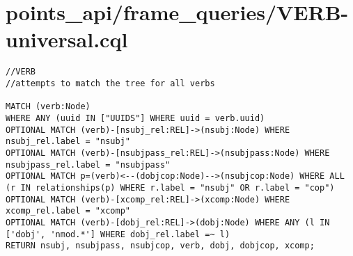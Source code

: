 \documentclass{article}
\begin{document}
\section*{points\_api/frame\_queries/VERB-universal.cql}
\begin{verbatim}
//VERB
//attempts to match the tree for all verbs

MATCH (verb:Node)
WHERE ANY (uuid IN ["UUIDS"] WHERE uuid = verb.uuid)
OPTIONAL MATCH (verb)-[nsubj_rel:REL]->(nsubj:Node) WHERE nsubj_rel.label = "nsubj"
OPTIONAL MATCH (verb)-[nsubjpass_rel:REL]->(nsubjpass:Node) WHERE nsubjpass_rel.label = "nsubjpass"
OPTIONAL MATCH p=(verb)<--(dobjcop:Node)-->(nsubjcop:Node) WHERE ALL (r IN relationships(p) WHERE r.label = "nsubj" OR r.label = "cop")
OPTIONAL MATCH (verb)-[xcomp_rel:REL]->(xcomp:Node) WHERE xcomp_rel.label = "xcomp"
OPTIONAL MATCH (verb)-[dobj_rel:REL]->(dobj:Node) WHERE ANY (l IN ['dobj', 'nmod.*'] WHERE dobj_rel.label =~ l)
RETURN nsubj, nsubjpass, nsubjcop, verb, dobj, dobjcop, xcomp;


\end{verbatim}
\pagebreak
\end{document}
